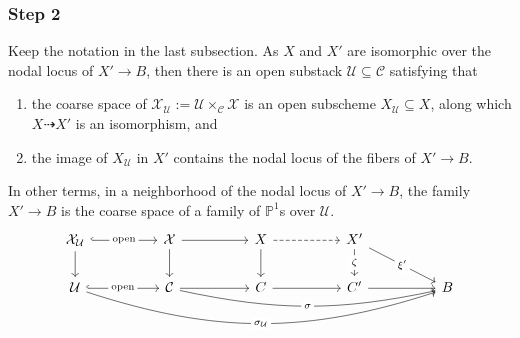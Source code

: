 \documentclass[a4paper,12pt]{amsart}
\newcommand{\cQ}{\mathcal{Q}}
\newcommand{\bP}{{\mathbb P}}
\newcommand{\cX}{{\mathcal{X}}}
\newcommand{\cU}{{\mathcal{U}}}
\newcommand{\bmu}{\bm{\mu}}
\newcommand\cC{{\mathcal{C}}}
\theoremstyle{definition}
\theoremstyle{remark}
\begin{document}
\subsubsection{Step 2}\label{sec:step 2} Keep the notation in the last subsection. As $X$ and $X'$ are isomorphic over the nodal locus of $X'\to B$, then there is an open substack $\cU\subseteq \cC$ satisfying that
\begin{enumerate}
    \item the coarse space of $\cX_{\cU}:= \cU \times_\cC \cX$ is an open subscheme $X_{\cU}\subseteq X$, along which $X\dashrightarrow X'$ is an isomorphism, and
    \item the image of $X_{\cU}$ in $X'$ contains the nodal locus of the fibers of $X'\to B$.
\end{enumerate}
In other terms, in a neighborhood of the nodal locus of $X'\to B$, the family $X'\to B$ is the coarse space of a family of $\bP^1$s over $\cU$.
\[\begin{tikzcd}[ampersand replacement=\&]
	{\mathcal{X}_{\mathcal{U}}} \&\& {\mathcal{X}} \&\& X \&\& {X'} \\
	{\mathcal{U}} \&\& {\mathcal{C}} \&\& C \&\& {C'} \&\& B
	\arrow["{\operatorname{open}}"{description}, hook, from=1-1, to=1-3]
	\arrow[from=1-1, to=2-1]
	\arrow[from=1-3, to=1-5]
	\arrow[from=1-3, to=2-3]
	\arrow[dashed, from=1-5, to=1-7]
	\arrow[from=1-5, to=2-5]
	\arrow["{\zeta}"{description}, from=1-7, to=2-7]
	\arrow["{\xi'}"{description}, from=1-7, to=2-9]
	\arrow["{\operatorname{open}}"{description}, hook, from=2-1, to=2-3]
	\arrow["{\sigma_{\mathcal{U}}}"{description}, bend right =18pt, from=2-1, to=2-9]
	\arrow[from=2-3, to=2-5]
	\arrow["\sigma"{description}, bend right =12pt , from=2-3, to=2-9]
	\arrow[from=2-5, to=2-7]
	\arrow[from=2-7, to=2-9]
\end{tikzcd}\]

\end{document}
